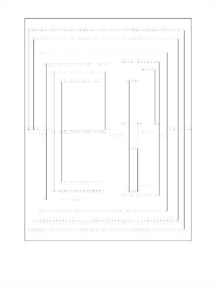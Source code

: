 \begin{figure}[htbp]
\centering
\includegraphics{figures/92_Appendix_Visual_Aids_Materials/shaded_card4.png}
\caption{}
\end{figure}

\clearpage

